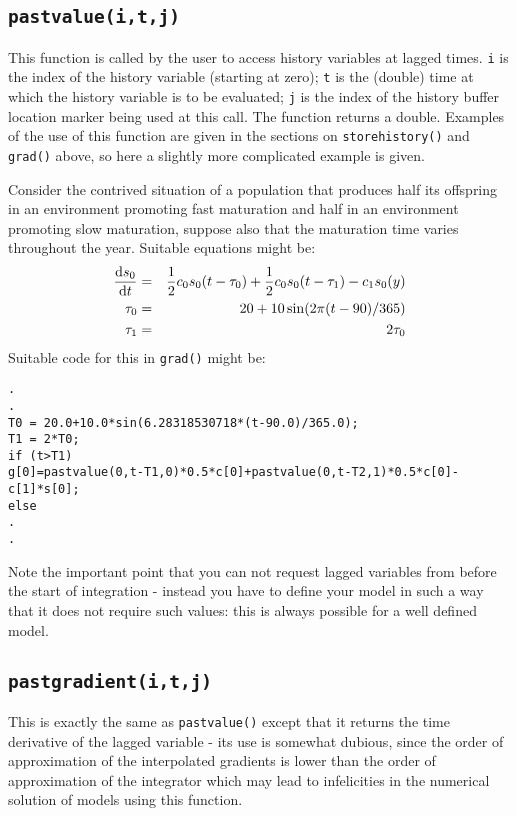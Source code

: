\documentclass[10pt] {article}
\newcommand{\dif}[2]{\frac{{\rm d} #1}{{\rm d} #2}}
\begin{document}
\subsection{\tt pastvalue(i,t,j)}
This function is called by the user to access history variables at lagged times. \verb+i+ is the %
index of the history variable (starting at zero); \verb+t+ is the (double) time at which the %
history variable is to be evaluated; \verb+j+ is the index of the history buffer location marker %
being used at this call. The function returns a double. Examples of the use of this function are %
given in the sections on \verb+storehistory()+ and \verb+grad()+ above, so here a slightly more %
complicated example is given.

Consider the contrived situation of a population that produces half its offspring in an %
environment promoting fast maturation  and half in an environment promoting slow maturation, %
suppose also that the maturation time varies throughout the year. Suitable equations might %
be:
\begin{eqnarray*}
\dif{s_0}{t} & = & \frac{1}{2} c_0 s_0 (t-\tau_0) + \frac{1}{2} c_0 s_0 (t-\tau_1) - c_1 s_0(y) %
\\ 
\tau_0 &=& 20+10 \sin(2 \pi (t-90)/365)\\
\tau_1 &=& 2\tau_0 
\end{eqnarray*}
Suitable code for this in \verb+grad()+ might be:
\begin{verbatim}
. 
. 
T0 = 20.0+10.0*sin(6.28318530718*(t-90.0)/365.0);
T1 = 2*T0;
if (t>T1)
g[0]=pastvalue(0,t-T1,0)*0.5*c[0]+pastvalue(0,t-T2,1)*0.5*c[0]-c[1]*s[0];
else
.
.
\end{verbatim}  
Note the important point that you can not request lagged variables from before the start of %
integration - instead you have to define your model in such a way that it does not require such %
values: this is always possible for a well defined model.

\subsection{\tt pastgradient(i,t,j)}

This is exactly the same as \verb+pastvalue()+ except that it returns the time derivative of the %
lagged variable - its use is somewhat dubious, since the order of approximation of the %
interpolated gradients is lower than the order of approximation of the integrator which may lead %
to infelicities in the numerical solution of models using this function.
\end{document}
